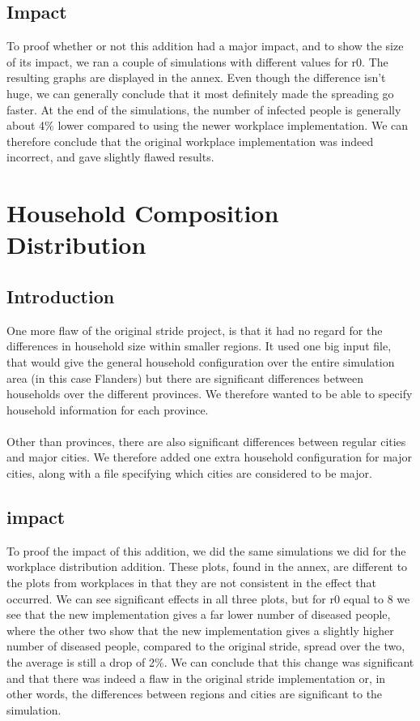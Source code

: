 \documentclass[runningheads]{llncs}
\begin{document}
	\subsection{Impact}
	To proof whether or not this addition had a major impact, and to show the size of its impact, we ran a couple of simulations with different values for r0. The resulting graphs are displayed in the annex. Even though the difference isn't huge, we can generally conclude that it most definitely made the spreading go faster. At the end of the simulations, the number of infected people is generally about 4\% lower compared to using the newer workplace implementation. We can therefore conclude that the original workplace implementation was indeed incorrect, and gave slightly flawed results.
	\section{Household Composition Distribution}
	\subsection{Introduction}
	One more flaw of the original stride project, is that it had no regard for the differences in household size within smaller regions. It used one big input file, that would give the general household configuration over the entire simulation area (in this case Flanders) but there are significant differences between households over the different provinces. We therefore wanted to be able to specify household information for each province. \\
	\\
	Other than provinces, there are also significant differences between regular cities and major cities. We therefore added one extra household configuration for major cities, along with a file specifying which cities are considered to be major.
	\subsection{impact}
	To proof the impact of this addition, we did the same simulations we did for the workplace distribution addition. These plots, found in the annex, are different to the plots from workplaces in that they are not consistent in the effect that occurred. We can see significant effects in all three plots, but for r0 equal to 8 we see that the new implementation gives a far lower number of diseased people, where the other two show that the new implementation gives a slightly higher number of diseased people, compared to the original stride, spread over the two, the average is still a drop of 2\%. We can conclude that this change was significant and that there was indeed a flaw in the original stride implementation or, in other words, the differences between regions and cities are significant to the simulation.
\end{document}

